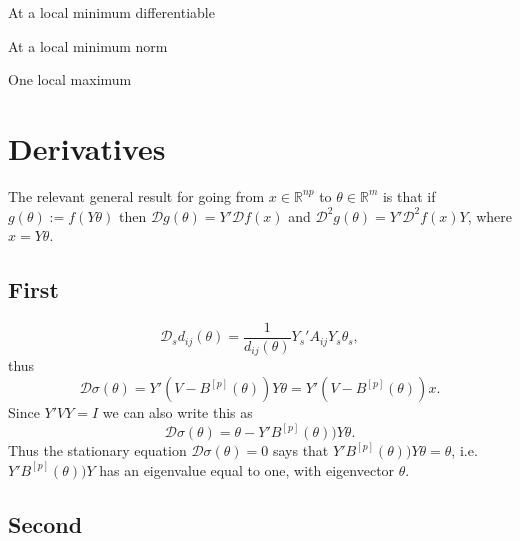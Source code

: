 \documentclass[
  12pt,
]{article}
\begin{document}
At a local minimum differentiable

At a local minimum norm

One local maximum

\section{Derivatives}\label{derivatives}

The relevant general result for going from \(x\in\mathbb{R}^{np}\) to \(\theta\in\mathbb{R}^m\) is that if \(g(\theta):=f(Y\theta)\) then \(\mathcal{D}g(\theta)=Y'\mathcal{D}f(x)\) and \(\mathcal{D}^2g(\theta)=Y'\mathcal{D}^2f(x)Y\), where \(x=Y\theta\).

\subsection{First}\label{first}

\begin{equation}
\mathcal{D}_sd_{ij}(\theta)=\frac{1}{d_{ij}(\theta)}Y_s'A_{ij}Y_s\theta_s,
\label{eq:firstder}
\end{equation}
thus
\begin{equation}
\mathcal{D}\sigma(\theta)=Y'(V-B^{[p]}(\theta))Y\theta=Y'(V-B^{[p]}(\theta))x.
\label{eq:firder2}
\end{equation}
Since \(Y'VY=I\) we can also write this as
\begin{equation}
\mathcal{D}\sigma(\theta)=\theta-Y'B^{[p]}(\theta))Y\theta.
\label{eq:firder3}
\end{equation}
Thus the stationary equation \(\mathcal{D}\sigma(\theta)=0\) says that
\(Y'B^{[p]}(\theta))Y\theta=\theta\), i.e.~\(Y'B^{[p]}(\theta))Y\)
has an eigenvalue equal to one, with eigenvector \(\theta\).

\subsection{Second}\label{second}
\end{document}
